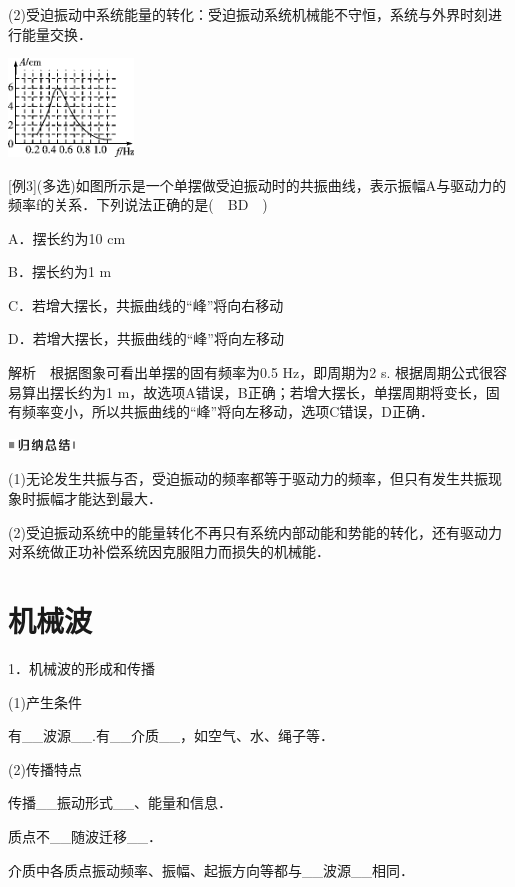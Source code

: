 (2)受迫振动中系统能量的转化：受迫振动系统机械能不守恒，系统与外界时刻进行能量交换．

\begin{center}\includegraphics[width=1.31111in,height=1.02847in]{media/image520.png}\end{center}
{[}例3{]}(多选)如图所示是一个单摆做受迫振动时的共振曲线，表示振幅A与驱动力的频率f的关系．下列说法正确的是(　BD　)

A．摆长约为10 cm

B．摆长约为1 m

C．若增大摆长，共振曲线的``峰''将向右移动

D．若增大摆长，共振曲线的``峰''将向左移动

解析　根据图象可看出单摆的固有频率为0.5 Hz，即周期为2 s.
根据周期公式很容易算出摆长约为1
m，故选项A错误，B正确；若增大摆长，单摆周期将变长，固有频率变小，所以共振曲线的``峰''将向左移动，选项C错误，D正确．

\begin{center}\includegraphics[width=0.70764in,height=0.12292in]{media/image13.png}\end{center}
(1)无论发生共振与否，受迫振动的频率都等于驱动力的频率，但只有发生共振现象时振幅才能达到最大．

(2)受迫振动系统中的能量转化不再只有系统内部动能和势能的转化，还有驱动力对系统做正功补偿系统因克服阻力而损失的机械能．

\section{机械波}




1．机械波的形成和传播

(1)产生条件

有\_\_波源\_\_.有\_\_介质\_\_，如空气、水、绳子等．

(2)传播特点

传播\_\_振动形式\_\_、能量和信息．

质点不\_\_随波迁移\_\_．

介质中各质点振动频率、振幅、起振方向等都与\_\_波源\_\_相同．

